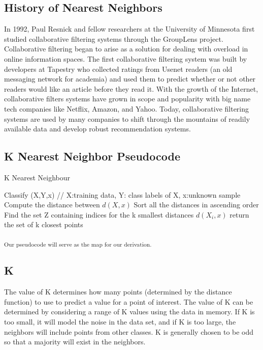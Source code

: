 \documentclass{report}
\begin{document}
\subsection*{History of Nearest Neighbors}

In 1992, Paul Resnick and fellow researchers at the University of Minnesota first studied collaborative filtering systems through the GroupLens project\cite{2}.  Collaborative filtering began to arise as a solution for dealing with overload in online information spaces. The first collaborative filtering system was built by developers at Tapestry who collected ratings from Usenet readers (an old messaging network for academia) and
used them to predict whether or not other readers would like an article before they read it.\cite{3} With the growth of the Internet, collaborative filters systems have grown in scope and popularity with big name tech companies like Netflix, Amazon, and Yahoo. Today, collaborative filtering systems are used by many companies to shift through the mountains of readily available data and develop robust recommendation systems.

\subsection*{K Nearest Neighbor Pseudocode }
\begin{algorithm}
  \caption{K Nearest Neighbour}
  \begin{algorithmic}
  	\State Classify (X,Y,x) // X:training data, Y: class labels of X, x:unknown sample
	\State Compute the distance between $d(X, x)$
	\State Sort all the distances in ascending order
	\EndFor
	\State Find the set Z containing indices for the k smallest distances $d(X_{i},x)$
	\State return the set of k closest points 
  \end{algorithmic}
\end{algorithm}
\textsubscript{Our pseudocode will serve as the map for our derivation.}

\subsection*{K}

The value of K determines how many points (determined by the distance function) to use to predict a value for a point of interest.
The value of K can be determined by considering a range of K values using the data in memory.
If K is too small, it will model the noise in the data set, and if K is too large, the neighbors will include points from other classes.
K is generally chosen to be odd so that a majority will exist in the neighbors.
\end{document}
